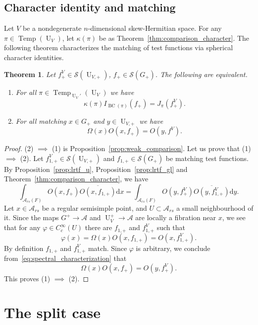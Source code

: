 \documentclass[letterpaper,11pt]{amsart}
\newcommand{\cA}{\mathcal{A}}
\newcommand{\cS}{\mathcal{S}}
\newcommand{\rd}{\mathrm{d}}
\newcommand{\<}{\negthickspace}
\DeclareMathOperator{\U}{U}
\DeclareMathOperator{\BC}{BC}
\DeclareMathOperator{\Temp}{Temp} \DeclareMathOperator{\temp}{temp}
\theoremstyle{definition}
\theoremstyle{plain}
\newtheorem{theorem}[definition]{Theorem}
\theoremstyle{remark}
\numberwithin{equation}{section}
\begin{document}
\subsection{Character identity and matching}
Let $V$ be a nondegenerate $n$-dimensional skew-Hermitian space. For any $\pi \in
\Temp(\U_V)$, let $\kappa(\pi)$ be as
Theorem~\ref{thm:comparison_character}. The following theorem characterizes
the matching of test functions via spherical character identities.

\begin{theorem} \label{thm:spectral_characterization_transfer}
Let $f_+^V \in \cS(\U_{V,+})$, $f_+ \in \cS(G_+)$. The following are
equivalent.
\begin{enumerate}
    \item For all $\pi \in \Temp_{\U_V'}(\U_V)$ we have
      \[
    \kappa(\pi) I_{\BC(\pi)}(f_+)=J_{\pi}(f^V_+).
    \]
    \item For all matching $x \in G_+$ and $y \in \U_{V,+}$ we have
    \[
    \Omega(x) O(x, f_+) = O(y, f^V).
    \]
\end{enumerate}
\end{theorem}


\begin{proof}
(2) $\implies$ (1) is Proposition~\ref{prop:weak_comparison}. Let us prove
that (1) $\implies$ (2). Let $f_{1, +}^V \in \cS(\U_{V, +})$ and $f_{1, +}
\in \cS(G_+)$ be matching test functions. By Proposition~\ref{prop:lrtf_u},
Proposition~\ref{prop:lrtf_gl} and Theorem~\ref{thm:comparison_character}, we
have
    \begin{equation}    \label{eq:spectral_characterization}
    \int_{\cA_{rs}(F)} O(x, f_{+})
    \overline{ O(x, f_{1, +}) } \rd x
    = \int_{\cA_{rs}(F)} O(y, f^V_+)
    \overline{O(y, f^V_{1, +})} \rd y.
    \end{equation}
Let $x \in \cA_{rs}$ be a regular semisimple point, and $U \subset \cA_{rs}$
a small neighbourhood of it. Since the maps $G^+ \to \cA$ and $\U_V^+ \to
\cA$ are locally a fibration near $x$, we see that for any $\varphi \in
C_c^\infty(U)$ there are $f_{1, +}$ and $f_{1, +}^V$ such that
    \[
    \varphi(x) =  \Omega(x) O(x, f_{1,+})  =
    O(x, f_{1, +}^V).
    \]
By definition $f_{1, +}$ and $f_{1, +}^V$ match. Since $\varphi$ is
arbitrary, we conclude from~\eqref{eq:spectral_characterization} that
    \[
    \Omega(x) O(x, f_+) = O(y, f_+^V).
    \]
This proves (1) $\implies$ (2).
\end{proof}


\section{The split case}    \label{sec:split_place_comparison}
\end{document}

